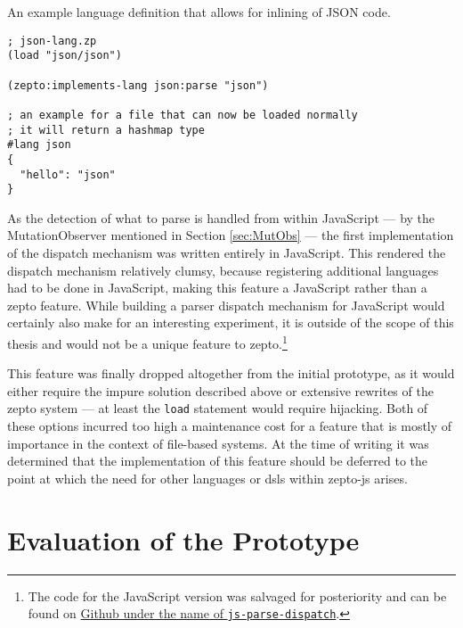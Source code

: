 \documentclass[oneside,11pt,xetex]{scrbook}
\begin{document}
\begin{listing}[H]
\caption{An example language definition that allows for inlining of JSON code.}
\begin{verbatim}
; json-lang.zp
(load "json/json")

(zepto:implements-lang json:parse "json")

; an example for a file that can now be loaded normally
; it will return a hashmap type
#lang json
{
  "hello": "json"
}
\end{verbatim}
\label{fig:json}
\end{listing}

As the detection of what to parse is handled from within JavaScript --- by the
MutationObserver mentioned in Section \ref{sec:MutObs} --- the first implementation
of the dispatch mechanism was written entirely in JavaScript. This rendered
the dispatch mechanism relatively clumsy, because registering
additional languages had to be done in JavaScript, making this feature
a JavaScript rather than a zepto feature. While building a parser dispatch
mechanism for JavaScript would certainly also make for an interesting experiment,
it is outside  of the scope of this thesis and would not be a unique feature
to zepto.\footnote{The code for the JavaScript version was salvaged for posteriority
and can be found on \href{https://github.com/hellerve/js-parse-dispatch}{Github under
the name of \texttt{js-parse-dispatch}}.}

This feature was finally dropped altogether from the initial prototype,
as it would either require the impure solution described above or extensive rewrites
of the zepto system --- at least the \texttt{load} statement would require hijacking.
Both of these options incurred too high a maintenance cost for a feature that is
mostly of importance in the context of file-based systems. At the time of writing it
was determined that the implementation of this feature should be deferred to the point
at which the need for other languages or \glspl{dsl} within zepto-js arises.

\chapter{Evaluation of the Prototype}
\label{chap:evaluation}
\end{document}
